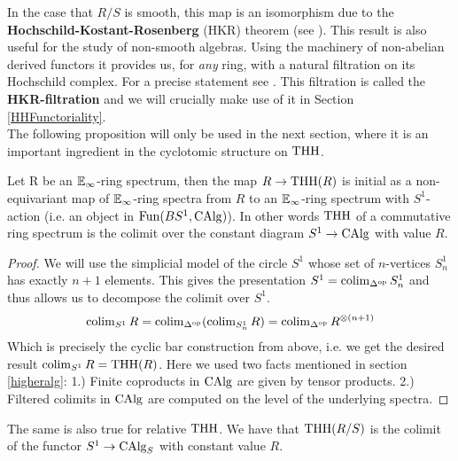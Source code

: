 In the case that $R/S$ is smooth, this map is an isomorphism due to the \textbf{Hochschild-Kostant-Rosenberg} (HKR) theorem (see \cite[Section~3.4]{loday2013cyclic}). 
This result is also useful for the study of non-smooth algebras. Using the machinery of non-abelian derived functors it provides us, for \textit{any} ring, with a natural filtration on its Hochschild complex. For a precise statement see \cite[Proposition~IV.4.1]{NS}. This filtration is called the \textbf{HKR-filtration} and we will crucially make use of it in Section \ref{HHFunctoriality}. 
\\
The following proposition will only be used in the next section, where it is an important ingredient in the cyclotomic structure on $\operatorname{THH}$.
\begin{prop}\cite{mcclureschwaenzlvogt}
\label{McClureSchwaenzlVogt}
Let R be an $\mathbb{E}_\infty$-ring spectrum, then the map $R\rightarrow \operatorname{THH}(R)$ is initial as a non-equivariant map of $\mathbb{E}_\infty$-ring spectra from $R$ to an $\mathbb{E}_\infty$-ring spectrum with $S^1$-action (i.e. an object in $\operatorname{Fun}(BS^1,\operatorname{CAlg})$). In other words $\operatorname{THH}$ of a commutative ring spectrum is the colimit over the constant diagram $S^1\rightarrow \operatorname{CAlg}$ with value $R$.
\end{prop}
\begin{proof}
    We will use the simplicial model of the circle $S^1$ whose set of $n$-vertices $S_n^1$ has exactly $n+1$ elements. This gives the presentation $S^1=\operatorname{colim}_{\Delta^{\operatorname{op}}}S_n^1$ and thus allows us to decompose the colimit over $S^1$.
    \begin{equation*}
        \operatorname{colim}_{S^1}R=\operatorname{colim}_{\Delta^{\operatorname{op}}}(\operatorname{colim}_{S_n^1}R)=\operatorname{colim}_{\Delta^{\operatorname{op}}}R^{\otimes(n+1)}
    \end{equation*} 
    Which is precisely the cyclic bar construction from above, i.e. we get the desired result $\operatorname{colim}_{S^1}R=\operatorname{THH}(R)$. Here we used two facts mentioned in section \ref{higheralg}: 1.) Finite coproducts in $\operatorname{CAlg}$ are given by tensor products. 2.) Filtered colimits in $\operatorname{CAlg}$ are computed on the level of the underlying spectra.
\end{proof}
The same is also true for relative $\operatorname{THH}$. We have that $\operatorname{THH}(R/S)$ is the colimit of the functor $S^1\rightarrow \operatorname{CAlg}_S$ with constant value $R$.
